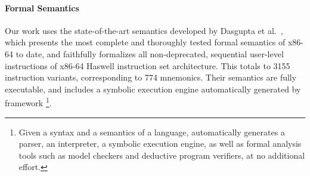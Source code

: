 
\paragraph{\ISA Formal Semantics} Our work uses the state-of-the-art \ISA
semantics developed by Dasgupta et al.~\cite{DasguptaAdve:PLDI19}, which
presents the most complete and thoroughly tested formal semantics of x86-64 to
date, and faithfully formalizes all non-deprecated, sequential
user-level instructions of x86-64 Haswell instruction set architecture.
This totals to 3155 instruction variants, corresponding to 774 mnemonics.
Their semantics are fully executable, and includes a symbolic execution engine
automatically generated by \K framework
%
    \footnote{Given a syntax and a semantics of a language, \K automatically
    generates a parser, an interpreter, a symbolic execution engine, as well
    as formal analysis tools such as model checkers and deductive program
    verifiers, at no additional effort.}.
%

